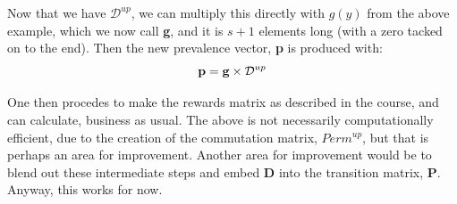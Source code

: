\documentclass[11pt,oneside,a4paper]{article} %
\begin{document}
Now that we have $\mathcal{D}^{up}$, we can multiply this directly with $g(y)$
from the above example, which we now call \textbf{g}, and it is $s+1$ elements
long (with a zero tacked on to the end). Then the new prevalence vector,
\textbf{p} is produced with:
\begin{equation}
 \text{\textbf{p}} = \text{\textbf{g}} \times \mathcal{D}^{up}
\end{equation}

One then procedes to make the rewards matrix as described in the course, and can
calculate, business as usual. The above is not necessarily computationally
efficient, due to the creation of the commutation matrix, $Perm^{up}$, but that
is perhaps an area for improvement. Another area for improvement would be to
blend out these intermediate steps and embed \textbf{D} into the transition
matrix, \textbf{P}. Anyway, this works for now.




\end{document}
